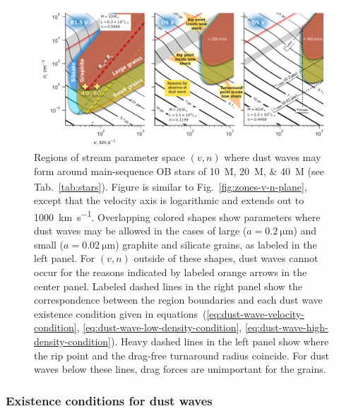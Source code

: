 \begin{figure}
  \centering
  \includegraphics[width=\linewidth]{figs/existence-dust-wave}
  \caption{Regions of stream parameter space \((v, n)\) where dust
    waves may form around main-sequence OB stars of
    \SIlist{10;20;40}{M_\odot} (see Tab.~\ref{tab:stars}).  Figure is
    similar to Fig.~\ref{fig:zones-v-n-plane}, except that the
    velocity axis is logarithmic and extends out to
    \SI{1000}{km.s^{-1}}.  Overlapping colored shapes show parameters
    where dust waves may be allowed in the cases of large
    (\(a = \SI{0.2}{\um}\)) and small (\(a = \SI{0.02}{\um}\))
    graphite and silicate grains, as labeled in the left panel.  For
    \((v, n)\) outside of these shapes, dust waves cannot occur for
    the reasons indicated by labeled orange arrows in the center
    panel.  Labeled dashed lines in the right panel show the
    correspondence between the region boundaries and each dust wave
    existence condition given in
    equations~(\ref{eq:dust-wave-velocity-condition},
    \ref{eq:dust-wave-low-density-condition},
    \ref{eq:dust-wave-high-density-condition}). Heavy dashed lines in
    the left panel show where the rip point and the drag-free
    turnaround radius coincide.  For dust waves below these lines,
    drag forces are unimportant for the grains.  }
  \label{fig:existence-dust-wave}
\end{figure}

\subsubsection{Existence conditions for dust waves}
\label{sec:exist-cond-separ}

